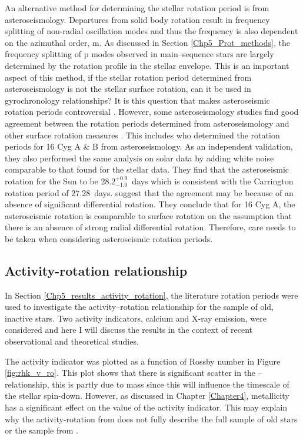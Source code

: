 An alternative method for determining the stellar rotation period is from asteroseismology. Departures from solid body rotation result in frequency splitting of non-radial oscillation modes and thus the frequency is also dependent on the azimuthal order, m. As discussed in Section \ref{Chp5_Prot_methods}, the frequency splitting of p modes observed in main--sequence stars are largely determined by the rotation profile in the stellar envelope. This is an important aspect of this method, if the stellar rotation period determined from asteroseismology is not the stellar surface rotation, can it be used in gyrochronology relationships? It is this question that makes asteroseismic rotation periods controversial \citep{Barnes_etal_2016_aspect_gyro}. However, some asteroseismology studies find good agreement between the rotation periods determined from asteroseismology and other surface rotation measures \citep{Chaplin_etal_2013,Gizon_etal_2013}. This includes \citet{Davies_etal_2015} who determined the rotation periods for 16 Cyg A \& B from asteroseismology. As an independent validation, they also performed the same analysis on solar data by adding white noise comparable to that found for the stellar data. They find that the asteroseismic rotation for the Sun to be $28.2^{+0.9}_{-1.0}$~days which is consistent with the Carrington rotation period of $27.28$~days. \citet{Davies_etal_2015} suggest that the agreement may be because of an absence of significant differential rotation. They conclude that for 16 Cyg A, the asteroseismic rotation is comparable to surface rotation on the assumption that there is an absence of strong radial differential rotation. Therefore, care needs to be taken when considering asteroseismic rotation periods.

\subsection{Activity-rotation relationship}
In Section \ref{Chp5_results_activity_rotation}, the literature rotation periods were used to investigate the activity--rotation relationship for the sample of old, inactive stars. Two activity indicators, calcium and X-ray emission, were considered and here I will discuss the results in the context of recent observational and theoretical studies.

The \Rprime activity indicator was plotted as a function of Rossby number in Figure \ref{fig:rhk_v_ro}. This plot shows that there is significant scatter in the \Rprime--\Ro relationship, this is partly due to mass since this will influence the timescale of the stellar spin-down. However, as discussed in Chapter \ref{Chapter4}, metallicity has a significant effect on the value of the \Rprime activity indicator. This may explain why the activity-rotation from \citet{Mamajek_Hillenbrand_2008} does not fully describe the full sample of old stars or the sample from \citet{Baliunas_etal_1996}.

